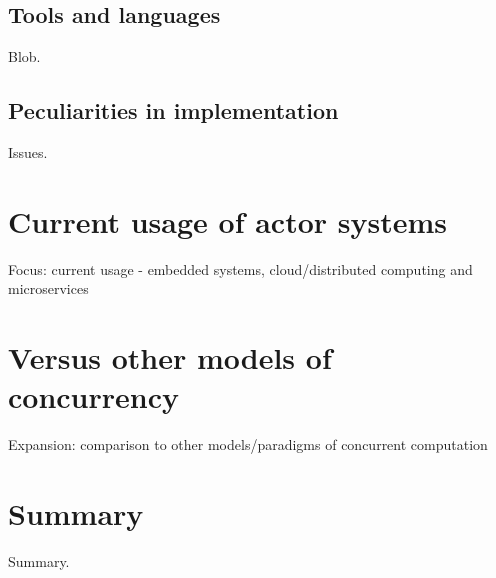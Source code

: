 \documentclass[A4]{article}
\begin{document}
\subsection{Tools and languages}
Blob.

\subsection{Peculiarities in implementation}
Issues.

\section{Current usage of actor systems}
Focus: current usage - embedded systems, cloud/distributed computing and microservices

\section{Versus other models of concurrency}
Expansion: comparison to other models/paradigms of concurrent computation

\section{Summary}
\label{summary}
Summary.

\nocite{robotron,
stonx,vice,650sim,herculessim,zib,4004,thermal1,thermal2,rojas}




\end{document}
